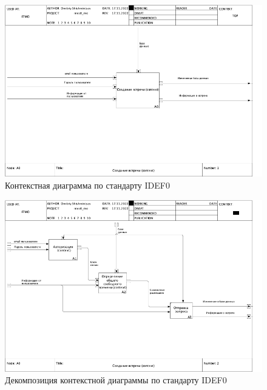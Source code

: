 \documentclass[14pt]{extreport}
\begin{document}
        \begin{landscape}
            \begin{figure}[h]   
                \centering
                \includegraphics[width=0.9\linewidth]{img/IDEF0-0.png}
                \caption{ Контекстная диаграмма по стандарту IDEF0}
                \label{fig:d1}
            \end{figure}

            \begin{figure}[h]   
                \centering
                \includegraphics[width=0.9\linewidth]{img/IDEF0-1.png}
                \caption{ Декомпозиция контекстной диаграммы по стандарту IDEF0}
                \label{fig:d2}
            \end{figure}


\end{landscape}
\end{document}

